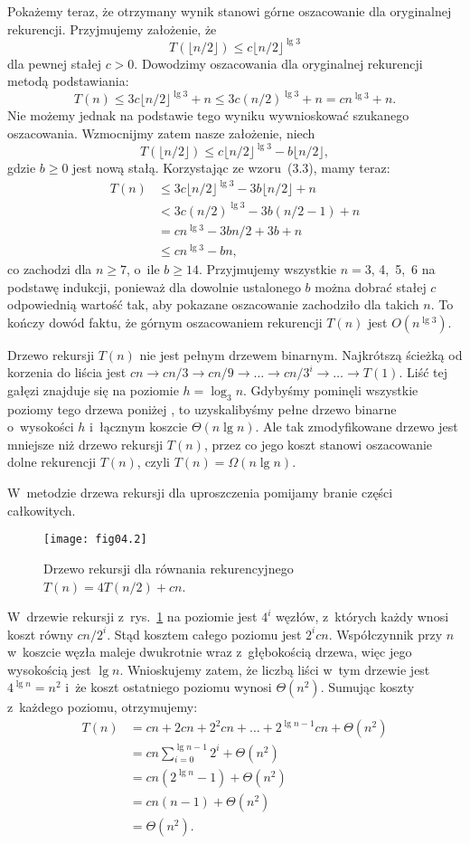 Pokażemy teraz, że otrzymany wynik stanowi górne oszacowanie dla oryginalnej rekurencji. Przyjmujemy założenie, że
\[
    T(\lfloor n/2\rfloor)\le c\lfloor n/2\rfloor^{\lg3}
\]
dla pewnej stałej $c>0$. Dowodzimy oszacowania dla oryginalnej rekurencji metodą podstawiania:
\[
	T(n) \le 3c\lfloor n/2\rfloor^{\lg3}+n \le 3c(n/2)^{\lg3}+n = cn^{\lg3}+n.
\]
Nie możemy jednak na podstawie tego wyniku wywnioskować szukanego oszacowania. Wzmocnijmy zatem nasze założenie, niech
\[
	T(\lfloor n/2\rfloor) \le c\lfloor n/2\rfloor^{\lg3}-b\lfloor n/2\rfloor,
\]
gdzie $b\ge0$ jest nową stałą. Korzystając ze wzoru~(3.3), mamy teraz:
\begin{align*}
	T(n) &\le 3c\lfloor n/2\rfloor^{\lg3}-3b\lfloor n/2\rfloor+n \\
	&< 3c(n/2)^{\lg3}-3b(n/2-1)+n \\
	&= cn^{\lg3}-3bn/2+3b+n \\
	&\le cn^{\lg3}-bn,
\end{align*}
co zachodzi dla $n\ge7$, o~ile $b\ge14$. Przyjmujemy wszystkie $n=3$, 4,~5,~6 na podstawę indukcji, ponieważ dla dowolnie ustalonego $b$ można dobrać stałej $c$ odpowiednią wartość tak, aby pokazane oszacowanie zachodziło dla takich $n$. To kończy dowód faktu, że górnym oszacowaniem rekurencji $T(n)$ jest $O(n^{\lg3})$.

\exercise %
Drzewo rekursji $T(n)$ nie jest pełnym drzewem binarnym. Najkrótszą ścieżką od korzenia do liścia jest $cn\to cn/3\to cn/9\to\dots\to cn/3^i\to\dots\to T(1)$. Liść tej gałęzi znajduje się na poziomie $h=\log_3n$. Gdybyśmy pominęli wszystkie poziomy tego drzewa poniżej , to uzyskalibyśmy pełne drzewo binarne o~wysokości $h$ i~łącznym koszcie $\Theta(n\lg n)$. Ale tak zmodyfikowane drzewo jest mniejsze niż drzewo rekursji $T(n)$, przez co jego koszt stanowi oszacowanie dolne rekurencji $T(n)$, czyli $T(n)=\Omega(n\lg n)$.

\exercise %
W~metodzie drzewa rekursji dla uproszczenia pomijamy branie części całkowitych.
\begin{figure}[ht]
	\begin{center}
		\texttt{[image: fig04.2]}
	\end{center}
	\caption{Drzewo rekursji dla równania rekurencyjnego $T(n)=4T(n/2)+cn$.} \label{fig:4.2-3}
\end{figure}
W~drzewie rekursji z~rys.~\ref{fig:4.2-3} na  poziomie jest $4^i$ węzłów, z~których każdy wnosi koszt równy $cn/2^i$. Stąd kosztem całego poziomu jest $2^icn$. Współczynnik przy $n$ w~koszcie węzła maleje dwukrotnie wraz z~głębokością drzewa, więc jego wysokością jest $\lg n$. Wnioskujemy zatem, że liczbą liści w~tym drzewie jest $4^{\lg n}=n^2$ i~że koszt ostatniego poziomu wynosi $\Theta(n^2)$. Sumując koszty z~każdego poziomu, otrzymujemy:
\begin{align*}
	T(n) &= cn+2cn+2^2cn+\dots+2^{\lg n-1}cn+\Theta(n^2) \\
	&= cn\sum_{i=0}^{\lg n-1}2^i+\Theta(n^2) \\
	&= cn(2^{\lg n}-1)+\Theta(n^2) \\
	&= cn(n-1)+\Theta(n^2) \\
	&= \Theta(n^2).
\end{align*}

